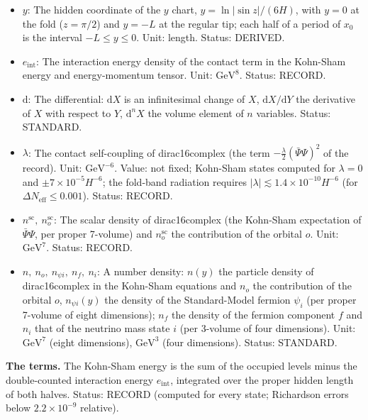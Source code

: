 \documentclass[
  10pt,
]{article}
\begin{document}
\begin{itemize}
  \(\pi/(6H)\) of \(x_0\), the Lovelock couplings, the cosmological
  constant \(\Lambda = -10H^2\) and the mass parameter \(m_\Psi = H\).
  Unit: GeV (1/length). Value: 14.296 TeV (from the fit of
  \(m_{\mathrm{W}}\) and \(\rho_{\mathrm{EW},0}\)). Status: AUTHOR.
\item
  \(y\): The hidden coordinate of the \(y\) chart,
  \(y = \ln\lvert\sin z\rvert/(6H)\), with \(y = 0\) at the fold
  (\(z = \pi/2\)) and \(y = -L\) at the regular tip; each half of a
  period of \(x_0\) is the interval \(-L \le y \le 0\). Unit: length.
  Status: DERIVED.
\item
  \(e_{\mathrm{int}}\): The interaction energy density of the contact
  term in the Kohn-Sham energy and energy-momentum tensor. Unit:
  \(\mathrm{GeV}^{8}\). Status: RECORD.
\item
  \(\mathrm{d}\): The differential: \(\mathrm{d}X\) is an infinitesimal
  change of \(X\), \(\mathrm{d}X/\mathrm{d}Y\) the derivative of \(X\)
  with respect to \(Y\), \(\mathrm{d}^nX\) the volume element of \(n\)
  variables. Status: STANDARD.
\item
  \(\lambda\): The contact self-coupling of dirac16complex (the term
  \(-\frac{\lambda}{2}(\bar\Psi\Psi)^2\) of the record). Unit:
  \(\mathrm{GeV}^{-6}\). Value: not fixed; Kohn-Sham states computed for
  \(\lambda = 0\) and \(\pm7\times10^{-5}H^{-6}\); the fold-band
  radiation requires
  \(\lvert\lambda\rvert \lesssim 1.4\times10^{-10}H^{-6}\) (for
  \(\Delta N_{\mathrm{eff}} \le 0.001\)). Status: RECORD.
\item
  \(n^{\mathrm{sc}},\ n^{\mathrm{sc}}_o\): The scalar density of
  dirac16complex (the Kohn-Sham expectation of \(\bar\Psi\Psi\), per
  proper 7-volume) and \(n^{\mathrm{sc}}_o\) the contribution of the
  orbital \(o\). Unit: \(\mathrm{GeV}^{7}\). Status: RECORD.
\item
  \(n,\ n_o,\ n_{\psi i},\ n_f,\ n_i\): A number density: \(n(y)\) the
  particle density of dirac16complex in the Kohn-Sham equations and
  \(n_o\) the contribution of the orbital \(o\), \(n_{\psi i}(y)\) the
  density of the Standard-Model fermion \(\psi_i\) (per proper 7-volume
  of eight dimensions); \(n_f\) the density of the fermion component
  \(f\) and \(n_i\) that of the neutrino mass state \(i\) (per 3-volume
  of four dimensions). Unit: \(\mathrm{GeV}^{7}\) (eight dimensions),
  \(\mathrm{GeV}^{3}\) (four dimensions). Status: STANDARD.
\end{itemize}

\textbf{The terms.} The Kohn-Sham energy is the sum of the occupied
levels minus the double-counted interaction energy \(e_{\mathrm{int}}\),
integrated over the proper hidden length of both halves. Status: RECORD
(computed for every state; Richardson errors below \(2.2\times10^{-9}\)
relative).
\end{document}
